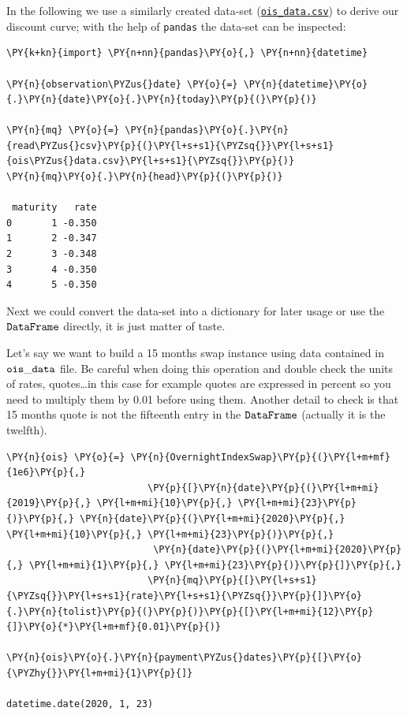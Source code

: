 In the following we use a similarly created data-set (\href{https://raw.githubusercontent.com/matteosan1/finance_course/develop/libro/input_files/ois_quotes.csv}{\texttt{ois\_data.csv}}) to derive our discount curve; with the help of \texttt{pandas} the data-set can be inspected:

\begin{codebox}
\begin{Verbatim}[commandchars=\\\{\}]
\PY{k+kn}{import} \PY{n+nn}{pandas}\PY{o}{,} \PY{n+nn}{datetime}

\PY{n}{observation\PYZus{}date} \PY{o}{=} \PY{n}{datetime}\PY{o}{.}\PY{n}{date}\PY{o}{.}\PY{n}{today}\PY{p}{(}\PY{p}{)}

\PY{n}{mq} \PY{o}{=} \PY{n}{pandas}\PY{o}{.}\PY{n}{read\PYZus{}csv}\PY{p}{(}\PY{l+s+s1}{\PYZsq{}}\PY{l+s+s1}{ois\PYZus{}data.csv}\PY{l+s+s1}{\PYZsq{}}\PY{p}{)}
\PY{n}{mq}\PY{o}{.}\PY{n}{head}\PY{p}{(}\PY{p}{)}

 maturity   rate
0       1 -0.350
1       2 -0.347
2       3 -0.348
3       4 -0.350
4       5 -0.350
\end{Verbatim}
\end{codebox}
\noindent
Next we could convert the data-set into a dictionary for later usage or
use the \(\tt{DataFrame}\) directly, it is just matter of taste.

Let's say we want to build a 15 months swap instance using data
contained in \(\tt{ois\_data}\) file. Be careful when doing this
operation and double check the units of rates, quotes\ldots in
this case for example quotes are expressed in percent so you need to
multiply them by 0.01 before using them. Another detail to check is that
15 months quote is not the fifteenth entry in the \(\tt{DataFrame}\)
(actually it is the twelfth).

\begin{codebox}[breakable, size=fbox, boxrule=1pt, pad at break*=1mm, colback=cellbackground, colframe=cellborder]
\begin{Verbatim}[commandchars=\\\{\}]
\PY{n}{ois} \PY{o}{=} \PY{n}{OvernightIndexSwap}\PY{p}{(}\PY{l+m+mf}{1e6}\PY{p}{,}
                         \PY{p}{[}\PY{n}{date}\PY{p}{(}\PY{l+m+mi}{2019}\PY{p}{,} \PY{l+m+mi}{10}\PY{p}{,} \PY{l+m+mi}{23}\PY{p}{)}\PY{p}{,} \PY{n}{date}\PY{p}{(}\PY{l+m+mi}{2020}\PY{p}{,} \PY{l+m+mi}{10}\PY{p}{,} \PY{l+m+mi}{23}\PY{p}{)}\PY{p}{,}
                          \PY{n}{date}\PY{p}{(}\PY{l+m+mi}{2020}\PY{p}{,} \PY{l+m+mi}{1}\PY{p}{,} \PY{l+m+mi}{23}\PY{p}{)}\PY{p}{]}\PY{p}{,}
                         \PY{n}{mq}\PY{p}{[}\PY{l+s+s1}{\PYZsq{}}\PY{l+s+s1}{rate}\PY{l+s+s1}{\PYZsq{}}\PY{p}{]}\PY{o}{.}\PY{n}{tolist}\PY{p}{(}\PY{p}{)}\PY{p}{[}\PY{l+m+mi}{12}\PY{p}{]}\PY{o}{*}\PY{l+m+mf}{0.01}\PY{p}{)}

\PY{n}{ois}\PY{o}{.}\PY{n}{payment\PYZus{}dates}\PY{p}{[}\PY{o}{\PYZhy{}}\PY{l+m+mi}{1}\PY{p}{]}

datetime.date(2020, 1, 23)
\end{Verbatim}
\end{codebox}

